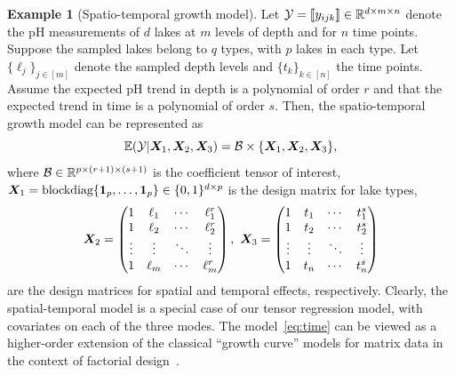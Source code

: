 \documentclass[twoside]{article}
\theoremstyle{plain}
\theoremstyle{definition}
\newtheorem{example}{Example}
\begin{document}
\begin{example}[Spatio-temporal growth model]
Let $\mathcal{Y}=\llbracket y_{ijk} \rrbracket\in\mathbb{R}^{d \times m\times n}$ denote the pH measurements of $d$ lakes at $m$ levels of depth and for $n$ time points. Suppose the sampled lakes belong to $q$ types, with $p$ lakes in each type. Let $\{\ell_j\}_{j\in[m]}$ denote the sampled depth levels and $\{t_k\}_{k\in[n]}$ the time points. Assume the expected pH trend in depth is a polynomial of order $r$ and that the expected trend in time is a polynomial of order $s$. Then, the spatio-temporal growth model can be represented as
\begin{equation}\label{eq:time}
\mathbb{E}(\mathcal{Y}|\bm X_1,\bm X_2,\bm X_3)=\mathcal{B}\times\{\bm X_1,\bm X_2,\bm X_3\},
\end{equation}
where $\mathcal{B}\in\mathbb{R}^{p\times (r+1)\times (s+1)}$ is the coefficient tensor of interest, $\bm X_1=\text{blockdiag}\{\mathbf{1}_p,\ldots,\mathbf{1}_p\}\in \{0,1\}^{d\times p}$ is the design matrix for lake types, 
\[
\bm X_2=
\begin{pmatrix}
1 & \ell_1&\cdots &\ell^{r}_1\\
1 & \ell_2&\cdots &\ell^{r}_2\\
\vdots &\vdots&\ddots&\vdots\\
1&\ell_{m}&\cdots&\ell^{r}_{m}
\end{pmatrix},\
\bm X_3=
\begin{pmatrix}
1 & t_1&\cdots &t^{s}_1\\
1 & t_2&\cdots &t^{s}_2\\
\vdots &\vdots&\ddots&\vdots\\
1&t_{n}&\cdots&t^{s}_{n}
\end{pmatrix}
\]
are the design matrices for spatial and temporal effects, respectively. Clearly, the spatial-temporal model is a special case of our tensor regression model, with covariates on each of the three modes. The model~\eqref{eq:time} can be viewed as a higher-order extension of the classical ``growth curve'' models for matrix data in the context of factorial design~\cite{gabriel1998generalised,potthoff1964generalized,srivastava2008estimation}. 

\end{example}
\end{document}

